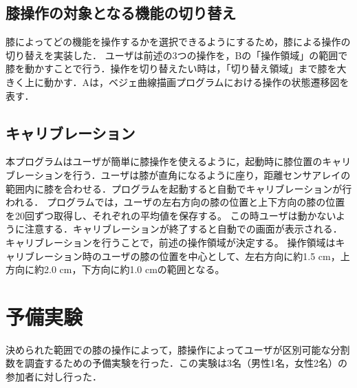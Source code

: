 \documentclass[submit, techrep]{ipsj}
\begin{document}
\subsection{膝操作の対象となる機能の切り替え}
膝によってどの機能を操作するかを選択できるようにするため，膝による操作の切り替えを実装した．
ユーザは前述の3つの操作を，Bの「操作領域」の範囲で膝を動かすことで行う．操作を切り替えたい時は，「切り替え領域」まで膝を大きく上に動かす．Aは，ベジェ曲線描画プログラムにおける操作の状態遷移図を表す．
\subsection{キャリブレーション}
本プログラムはユーザが簡単に膝操作を使えるように，起動時に膝位置のキャリブレーションを行う．ユーザは膝が直角になるように座り，距離センサアレイの範囲内に膝を合わせる．プログラムを起動すると自動でキャリブレーションが行われる．
プログラムでは，ユーザの左右方向の膝の位置と上下方向の膝の位置を20回ずつ取得し、それぞれの平均値を保存する。
この時ユーザは動かないように注意する．キャリブレーションが終了すると自動での画面が表示される．
キャリブレーションを行うことで，前述の操作領域が決定する。
操作領域はキャリブレーション時のユーザの膝の位置を中心として、左右方向に約1.5 \si{cm}，上方向に約2.0 \si{cm}，下方向に約1.0 \si{cm}の範囲となる。



\section{予備実験}
決められた範囲での膝の操作によって，膝操作によってユーザが区別可能な分割数を調査するための予備実験を行った．この実験は3名（男性1名，女性2名）の参加者に対し行った．
\end{document}
